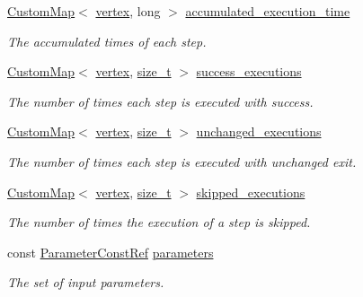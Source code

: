 \begin{DoxyCompactItemize}
\hyperlink{custom__map_8hpp_a18ca01763abbe3e5623223bfe5aaac6b}{Custom\+Map}$<$ \hyperlink{graph_8hpp_abefdcf0544e601805af44eca032cca14}{vertex}, long $>$ \hyperlink{classDesignFlowManager_a63c70d202fd40d1db1f537d970e8fae3}{accumulated\+\_\+execution\+\_\+time}
\begin{DoxyCompactList}\small\item\em The accumulated times of each step. \end{DoxyCompactList}\item 
\hyperlink{custom__map_8hpp_a18ca01763abbe3e5623223bfe5aaac6b}{Custom\+Map}$<$ \hyperlink{graph_8hpp_abefdcf0544e601805af44eca032cca14}{vertex}, \hyperlink{tutorial__fpt__2017_2intro_2sixth_2test_8c_a7c94ea6f8948649f8d181ae55911eeaf}{size\+\_\+t} $>$ \hyperlink{classDesignFlowManager_aa583fc57e8f7514426a8b1891ae0bffd}{success\+\_\+executions}
\begin{DoxyCompactList}\small\item\em The number of times each step is executed with success. \end{DoxyCompactList}\item 
\hyperlink{custom__map_8hpp_a18ca01763abbe3e5623223bfe5aaac6b}{Custom\+Map}$<$ \hyperlink{graph_8hpp_abefdcf0544e601805af44eca032cca14}{vertex}, \hyperlink{tutorial__fpt__2017_2intro_2sixth_2test_8c_a7c94ea6f8948649f8d181ae55911eeaf}{size\+\_\+t} $>$ \hyperlink{classDesignFlowManager_a5d95ea33043a9a5b10a583d0601ab0f3}{unchanged\+\_\+executions}
\begin{DoxyCompactList}\small\item\em The number of times each step is executed with unchanged exit. \end{DoxyCompactList}\item 
\hyperlink{custom__map_8hpp_a18ca01763abbe3e5623223bfe5aaac6b}{Custom\+Map}$<$ \hyperlink{graph_8hpp_abefdcf0544e601805af44eca032cca14}{vertex}, \hyperlink{tutorial__fpt__2017_2intro_2sixth_2test_8c_a7c94ea6f8948649f8d181ae55911eeaf}{size\+\_\+t} $>$ \hyperlink{classDesignFlowManager_a3819ea61eec3ea670467397a954b3e84}{skipped\+\_\+executions}
\begin{DoxyCompactList}\small\item\em The number of times the execution of a step is skipped. \end{DoxyCompactList}\item 
const \hyperlink{Parameter_8hpp_a37841774a6fcb479b597fdf8955eb4ea}{Parameter\+Const\+Ref} \hyperlink{classDesignFlowManager_a445e732d3d9516b40ad5862519a01cfc}{parameters}
\begin{DoxyCompactList}\small\item\em The set of input parameters. \end{DoxyCompactList}\item 

\end{DoxyCompactItemize}
